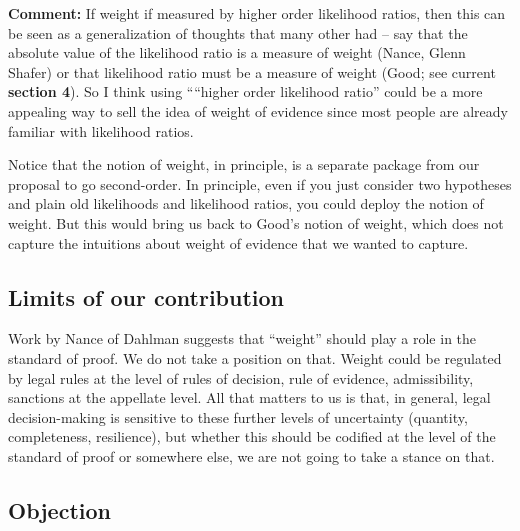 \documentclass[
  10pt,
  dvipsnames,enabledeprecatedfontcommands]{scrartcl}
\begin{document}
\textbf{Comment:} If weight if measured by higher order likelihood
ratios, then this can be seen as a generalization of thoughts that many
other had -- say that the absolute value of the likelihood ratio is a
measure of weight (Nance, Glenn Shafer) or that likelihood ratio must be
a measure of weight (Good; see current \textbf{section 4}). So I think
using ````higher order likelihood ratio'' could be a more appealing way
to sell the idea of weight of evidence since most people are already
familiar with likelihood ratios.



Notice that the notion of weight, in principle, is a separate package
from our proposal to go second-order. In principle, even if you just
consider two hypotheses and plain old likelihoods and likelihood ratios,
you could deploy the notion of weight. But this would bring us back to
Good's notion of weight, which does not capture the intuitions about
weight of evidence that we wanted to capture.


\hypertarget{limits-of-our-contribution}{%
\subsection{Limits of our
contribution}\label{limits-of-our-contribution}}

Work by Nance of Dahlman suggests that ``weight'' should play a role in
the standard of proof. We do not take a position on that. Weight could
be regulated by legal rules at the level of rules of decision, rule of
evidence, admissibility, sanctions at the appellate level. All that
matters to us is that, in general, legal decision-making is sensitive to
these further levels of uncertainty (quantity, completeness,
resilience), but whether this should be codified at the level of the
standard of proof or somewhere else, we are not going to take a stance
on that.

\hypertarget{objection}{%
\subsection{Objection}\label{objection}}
\end{document}
